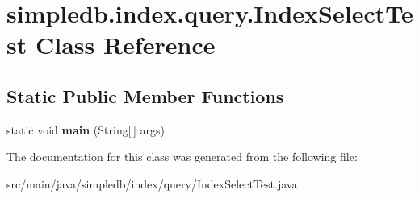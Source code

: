 \hypertarget{classsimpledb_1_1index_1_1query_1_1IndexSelectTest}{}\section{simpledb.\+index.\+query.\+Index\+Select\+Test Class Reference}
\label{classsimpledb_1_1index_1_1query_1_1IndexSelectTest}
\subsection*{Static Public Member Functions}
\begin{DoxyCompactItemize}
\item 
\mbox{\label{classsimpledb_1_1index_1_1query_1_1IndexSelectTest_a075a395ff7e17b5ef77653ad6aee4e70}} 
static void {\bfseries main} (String\mbox{[}$\,$\mbox{]} args)
\end{DoxyCompactItemize}


The documentation for this class was generated from the following file\+:\begin{DoxyCompactItemize}
\item 
src/main/java/simpledb/index/query/Index\+Select\+Test.\+java\end{DoxyCompactItemize}
